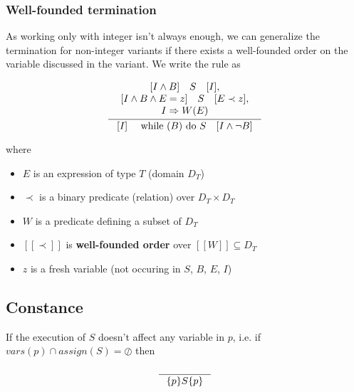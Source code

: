 \documentclass[12pt, a4paper]{book}
\begin{document}
    \subsubsection{Well-founded termination}

    As working only with integer isn't always enough, we can generalize the
    termination for non-integer variants if there exists a well-founded order
    on the variable discussed in the variant. We write the rule as

    \begin{center}
    \begin{minipage}{0.6\linewidth}
    \begin{framed}
    \[
        \inference{
            {\begin{array}{c}
                \lbrack I \land B \rbrack\quad S\quad [I], \\
                \lbrack I \land B \land E = z \rbrack\quad S\quad [E \prec z], \\
                I \Rightarrow W(E)
            \end{array}}
        }
        {
        \lbrack I\rbrack\quad \textrm{ while } (B) \textrm{ do } S\quad [I \land\lnot{} B]
        }
    \]
    \end{framed}
    \end{minipage}
    \end{center}

    where
    \begin{itemize}
        \item $E$ is an expression of type $T$ (domain ${D}_{T}$)
        \item $\prec$ is a binary predicate (relation) over ${D}_{T} \times {D}_{T}$
        \item $W$ is a predicate defining a subset of $D_T$
        \item $[[\prec]]$ is \textbf{well-founded order} over $[[W]] \subseteq {D}_T$
        \item $z$ is a fresh variable (not occuring in $S$, $B$, $E$, $I$)
    \end{itemize}

    \subsection{Constance}

    If the execution of $S$ doesn't affect any variable in $p$, i.e.
    if $vars(p) \cap assign(S) = \oslash$ then

    \begin{center}
    \begin{minipage}{0.5\linewidth}
    \begin{framed}
        \[
        \inference{}
        { \{ p \} S \{ p \}}
    \]
    \end{framed}
    \end{minipage}
    \end{center}
\end{document}
